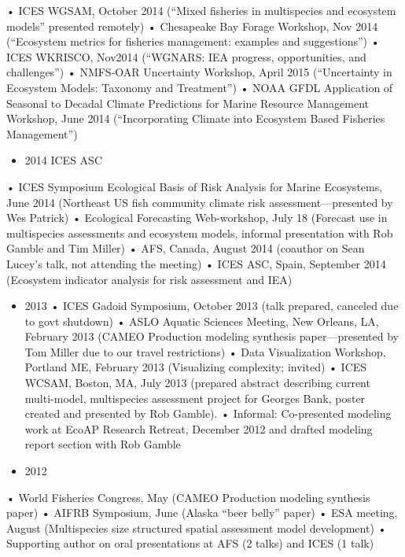 \documentclass[11pt, a4paper]{awesome-cv}
\providecommand{\tightlist}{%
	\setlength{\itemsep}{0pt}\setlength{\parskip}{0pt}}
\begin{document}
• ICES WGSAM, October 2014 (``Mixed fisheries in multispecies and
ecosystem models'' presented remotely) • Chesapeake Bay Forage Workshop,
Nov 2014 (``Ecosystem metrics for fisheries management: examples and
suggestions'') • ICES WKRISCO, Nov2014 (``WGNARS: IEA progress,
opportunities, and challenges'') • NMFS-OAR Uncertainty Workshop, April
2015 (``Uncertainty in Ecosystem Models: Taxonomy and Treatment'') •
NOAA GFDL Application of Seasonal to Decadal Climate Predictions for
Marine Resource Management Workshop, June 2014 (``Incorporating Climate
into Ecosystem Based Fisheries Management'')

\begin{itemize}
\tightlist
\item
  2014 ICES ASC
\end{itemize}

• ICES Symposium Ecological Basis of Risk Analysis for Marine
Ecosystems, June 2014 (Northeast US fish community climate risk
assessment---presented by Wes Patrick) • Ecological Forecasting
Web-workshop, July 18 (Forecast use in multispecies assessments and
ecosystem models, informal presentation with Rob Gamble and Tim Miller)
• AFS, Canada, August 2014 (coauthor on Sean Lucey's talk, not attending
the meeting) • ICES ASC, Spain, September 2014 (Ecosystem indicator
analysis for risk assessment and IEA)

\begin{itemize}
\item
  2013 • ICES Gadoid Symposium, October 2013 (talk prepared, canceled
  due to govt shutdown) • ASLO Aquatic Sciences Meeting, New Orleans,
  LA, February 2013 (CAMEO Production modeling synthesis
  paper---presented by Tom Miller due to our travel restrictions) • Data
  Visualization Workshop, Portland ME, February 2013 (Visualizing
  complexity; invited) • ICES WCSAM, Boston, MA, July 2013 (prepared
  abstract describing current multi-model, multispecies assessment
  project for Georges Bank, poster created and presented by Rob Gamble).
  • Informal: Co-presented modeling work at EcoAP Research Retreat,
  December 2012 and drafted modeling report section with Rob Gamble
\item
  2012
\end{itemize}

• World Fisheries Congress, May (CAMEO Production modeling synthesis
paper) • AIFRB Symposium, June (Alaska ``beer belly'' paper) • ESA
meeting, August (Multispecies size structured spatial assessment model
development) • Supporting author on oral presentations at AFS (2 talks)
and ICES (1 talk)
\end{document}
